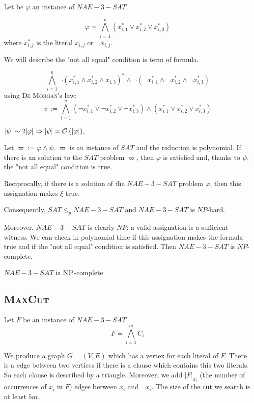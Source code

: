 Let be $\varphi$ an instance of $NAE-3-SAT$.

$$
    \varphi = \bigwedge\limits_{i=1}^n \left(x_{i,1}^* \vee x_{i,2}^* \vee x_{i,3}^*\right)
$$
where $x_{i,j}^*$ is the literal $x_{i,j}$ or $\neg x_{i,j}$.

We will describe the "not all equal" condition is term of formula.

$$
    \bigwedge\limits_{i=1}^n \neg(x_{i,1}^* \wedge x_{i,2}^* \wedge x_{i,3})^* \wedge \neg(\neg x_{i,1}^* \wedge \neg x_{i,2}^* \wedge \neg x_{i,3}^*)
$$
using \textsc{De Morgan}'s law:
$$
    \psi:=\bigwedge\limits_{i=1}^n (\neg x_{i,1}^* \vee \neg x_{i,2}^* \vee \neg x_{i,3}^*) \wedge (x_{i,1}^* \vee x_{i,2}^* \vee x_{i,3}^*)
$$

$\vert \psi\vert \sim 2\vert \varphi \vert \Rightarrow \vert \psi \vert = \mathcal O \left( \vert\varphi\vert \right)$. 

Let $\varpi := \varphi \wedge \psi$. $\varpi$ is an instance of $SAT$ and the reduction is polynomial. If there is an solution to the $SAT$ problem $\varpi$, then $\varphi$ is satisfied and, thanks to $\psi$, the "not all equal" condition is true.

Reciprocally, if there is a solution of the $NAE-3-SAT$ problem $\varphi$, then this assignation makes $\xi$ true.

Consequently, $SAT \leqslant_p NAE-3-SAT$ and $NAE-3-SAT$ is $NP$-hard. 

Moreover, $NAE-3-SAT$ is clearly $NP$: a valid assignation is a sufficient witness. We can check in polynomial time if this assignation makes the formula true and if the "not all equal" condition is satisfied. Then $NAE-3-SAT$ is $NP$-complete.

\begin{theorem}
    $NAE-3-SAT$ is $\textsc{NP}$-complete
\end{theorem}
   

\subsection{\textsc{MaxCut}}

Let $F$ be an instance of $NAE-3-SAT$
$$
    F=\bigwedge\limits_{i=1}^m C_i
$$

We produce a graph $G=(V,E)$ which has a vertex for each literal of $F$. There is a edge between two vertices if there is a clause which contains this two literals. So each clause is described by a triangle. Moreover, we add $\vert F\vert_{x_i}$ (the number of occurrences of $x_i$ in $F$) edges between $x_i$ and $\neg x_i$. The size of the cut we search is at least $5m$.

